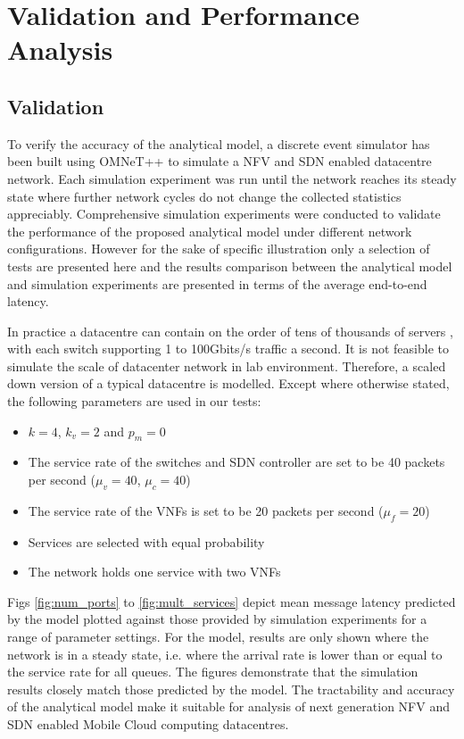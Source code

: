 \section{Validation and Performance Analysis}
\label{sec:validation}

\subsection{Validation}

To verify the accuracy of the analytical model, a discrete event simulator has been built using OMNeT++ \cite{VargaH08} to simulate a NFV and SDN enabled datacentre network. Each simulation experiment was run until the network reaches its steady state where further network cycles do not change the collected statistics appreciably. Comprehensive simulation experiments were conducted to validate the performance of the proposed analytical model under different network configurations. However for the sake of specific illustration only a selection of tests are presented here and the results comparison between the analytical model and simulation experiments are presented in terms of the average end-to-end latency.

In practice a datacentre can contain on the order of tens of thousands of servers \cite{AWS16}, with each switch supporting 1 to 100Gbits/s traffic a second. It is not feasible to simulate the scale of datacenter network in lab environment. Therefore, a scaled down version of a typical datacentre is modelled. Except where otherwise stated, the following parameters are used in our tests:

\begin{itemize}
	\item $k = 4$, $k_{v} = 2$ and $p_{m} = 0$
	\item The service rate of the switches and SDN controller are set to be 40 packets per second ($\mu_{v} = 40$, $\mu_{c} = 40$)
	\item The service rate of the VNFs is set to be 20 packets per second ($\mu_{f} = 20$)
	\item Services are selected with equal probability
	\item The network holds one service with two VNFs
\end{itemize}

Figs \ref{fig:num_ports} to \ref{fig:mult_services} depict mean message latency predicted by the model plotted against those provided by simulation experiments for a range of parameter settings. For the model, results are only shown where the network is in a steady state, i.e. where the arrival rate is lower than or equal to the service rate for all queues. The figures demonstrate that the simulation results closely match those predicted by the model. The tractability and accuracy of the analytical model make it suitable for analysis of next generation NFV and SDN enabled Mobile Cloud computing datacentres.

